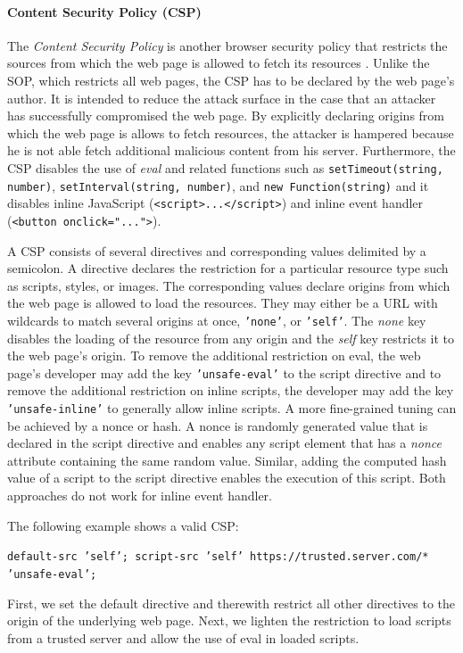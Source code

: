 \paragraph{Content Security Policy (CSP)}

	The \textit{Content Security Policy} is another browser security policy that restricts the sources from which the web page is allowed to fetch its resources \cite{w3cContentSecurityPolicySpecification}. Unlike the SOP, which restricts all web pages, the CSP has to be declared by the web page's author. It is intended to reduce the attack surface in the case that an attacker has successfully compromised the web page. By explicitly declaring origins from which the web page is allows to fetch resources, the attacker is hampered because he is not able fetch additional malicious content from his server. Furthermore, the CSP disables the use of \textit{eval} and related functions such as \texttt{setTimeout(string, number)}, \texttt{setInterval(string, number)}, and \texttt{new Function(string)} and it disables inline JavaScript (\texttt{<script>...</script>}) and inline event handler (\texttt{<button onclick="...">}).
	
	A CSP consists of several directives and corresponding values delimited by a semicolon. A directive declares the restriction for a particular resource type such as scripts, styles, or images. The corresponding values declare origins from which the web page is allowed to load the resources. They may either be a URL with wildcards to match several origins at once, \texttt{'none'}, or \texttt{'self'}. The \textit{none} key disables the loading of the resource from any origin and the \textit{self} key restricts it to the web page's origin. To remove the additional restriction on eval, the web page's developer may add the key \texttt{'unsafe-eval'} to the script directive and to remove the additional restriction on inline scripts, the developer may add the key \texttt{'unsafe-inline'} to generally allow inline scripts. A more fine-grained tuning can be achieved by a nonce or hash. A nonce is randomly generated value that is declared in the script directive and enables any script element that has a \textit{nonce} attribute containing the same random value. Similar, adding the computed hash value of a script to the script directive enables the execution of this script. Both approaches do not work for inline event handler.
	
	The following example shows a valid CSP:
	\begin{center}
		\texttt{default-src 'self'; script-src 'self' https://trusted.server.com/* 'unsafe-eval';}
	\end{center}
	First, we set the default directive and therewith restrict all other directives to the origin of the underlying web page. Next, we lighten the restriction to load scripts from a trusted server and allow the use of eval in loaded scripts.

